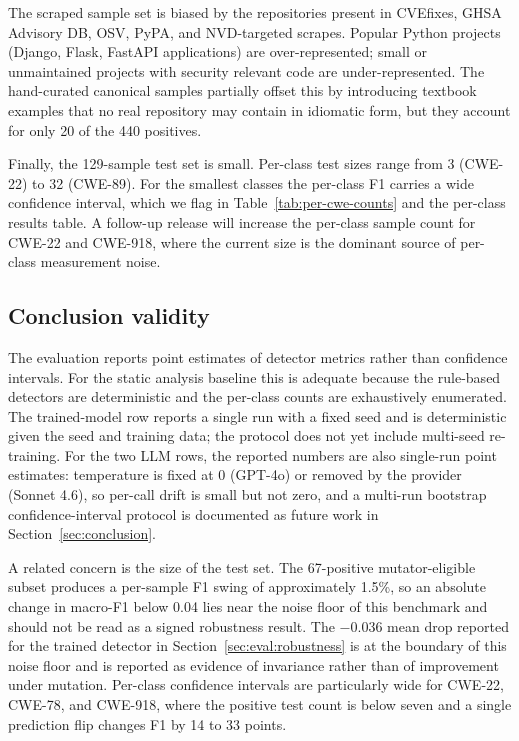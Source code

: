 The scraped sample set is biased by the repositories present in CVEfixes,
GHSA Advisory DB, OSV, PyPA, and NVD-targeted scrapes. Popular Python
projects (Django, Flask, FastAPI applications) are over-represented;
small or unmaintained projects with security relevant code are
under-represented. The hand-curated canonical samples partially offset
this by introducing textbook examples that no real repository may
contain in idiomatic form, but they account for only 20 of the 440
positives.

Finally, the 129-sample test set is small. Per-class test sizes range
from 3 (CWE-22) to 32 (CWE-89). For the smallest classes the per-class
F1 carries a wide confidence interval, which we flag in
Table~\ref{tab:per-cwe-counts} and the per-class results table. A
follow-up release will increase the per-class sample count for
CWE-22 and CWE-918, where the current size is the dominant source of
per-class measurement noise.

\subsection{Conclusion validity}
\label{sec:threats:conclusion}

The evaluation reports point estimates of detector metrics rather than
confidence intervals. For the static analysis baseline this is adequate
because the rule-based detectors are deterministic and the per-class
counts are exhaustively enumerated. The trained-model row reports a
single run with a fixed seed and is deterministic given the seed and
training data; the protocol does not yet include multi-seed
re-training. For the two LLM rows, the reported numbers are also
single-run point estimates: temperature is fixed at 0 (GPT-4o) or
removed by the provider (Sonnet 4.6), so per-call drift is small but
not zero, and a multi-run bootstrap confidence-interval protocol is
documented as future work in Section~\ref{sec:conclusion}.

A related concern is the size of the test set. The 67-positive
mutator-eligible subset produces a per-sample F1 swing of approximately
1.5\%, so an absolute change in macro-F1 below 0.04 lies near the
noise floor of this benchmark and should not be read as a signed
robustness result. The $-0.036$ mean drop reported for the trained
detector in Section~\ref{sec:eval:robustness} is at the boundary of
this noise floor and is reported as evidence of invariance rather
than of improvement under mutation. Per-class confidence intervals
are particularly wide for CWE-22, CWE-78, and CWE-918, where the
positive test count is below seven and a single prediction flip
changes F1 by 14 to 33 points.

